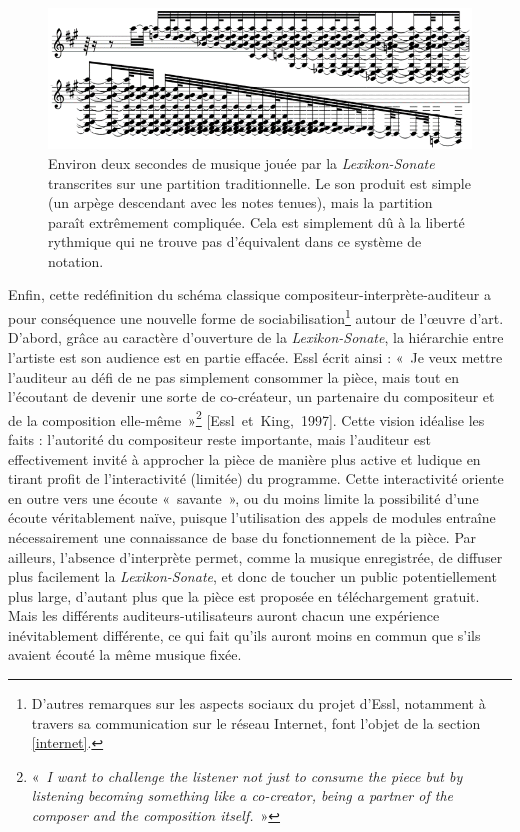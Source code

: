 \documentclass[a4paper,12pt]{article}
\newcommand{\guill}[1]{«~#1~»}
\newcommand{\cicite}[1]{{\footnotesize[#1]}}
\begin{document}
\begin{figure}[!h]
\begin{center}
\includegraphics[width=12cm]{images/partitionls.png}
\caption{\footnotesize Environ deux secondes de musique jouée par la \emph{Lexikon-Sonate} transcrites sur une partition traditionnelle. Le son produit est simple (un arpège descendant avec les notes tenues), mais la partition paraît extrêmement compliquée. Cela est simplement dû à la liberté rythmique qui ne trouve pas d'équivalent dans ce système de notation.}
\label{partitionls}
\end{center}
\end{figure}

Enfin, cette redéfinition du schéma classique compositeur-interprète-auditeur a pour conséquence une nouvelle forme de sociabilisation\footnote{D'autres remarques sur les aspects sociaux du projet d'Essl, notamment à travers sa communication sur le réseau Internet, font l'objet de la section \ref{internet}.} autour de l'œuvre d'art. D'abord, grâce au caractère d'ouverture de la \emph{Lexikon-Sonate}, la hiérarchie entre l'artiste est son audience est en partie effacée. Essl écrit ainsi : \guill{Je veux mettre l'auditeur au défi de ne pas simplement consommer la pièce, mais tout en l'écoutant de devenir une sorte de co-créateur, un partenaire du compositeur et de la composition elle-même}\footnote{\guill{\emph{I want to challenge the listener not just to consume the piece but by listening becoming something like a co-creator, being a partner of the composer and the composition itself.}}} \cicite{Essl~et~King,~1997}. Cette vision idéalise les faits : l'autorité du compositeur reste importante, mais l'auditeur est effectivement invité à approcher la pièce de manière plus active et ludique en tirant profit de l'interactivité (limitée) du programme. Cette interactivité oriente en outre vers une écoute \guill{savante}, ou du moins limite la possibilité d'une écoute véritablement naïve, puisque l'utilisation des appels de modules entraîne nécessairement une connaissance de base du fonctionnement de la pièce. Par ailleurs, l'absence d'interprète permet, comme la musique enregistrée, de diffuser plus facilement la \emph{Lexikon-Sonate}, et donc de toucher un public potentiellement plus large, d'autant plus que la pièce est proposée en téléchargement gratuit. Mais les différents auditeurs-utilisateurs auront chacun une expérience inévitablement différente, ce qui fait qu'ils auront moins en commun que s'ils avaient écouté la même musique fixée.
\end{document}
